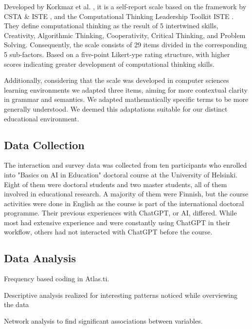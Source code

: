 \documentclass[sn-mathphys, Numbered]{sn-jnl}%
\theoremstyle{thmstyleone}%
\theoremstyle{thmstyletwo}%
\theoremstyle{thmstylethree}%
\begin{document}
Developed by Korkmaz et al. \parencite*{korkmaz_validity_2017-1}, it is a self-report scale based on the framework by CSTA \& ISTE \parencite*{csta_iste_operational_2015}, and the Computational Thinking Leadership Toolkit ISTE \parencite*{iste_computational_2011}. They define computational thinking as the result of 5 intertwined skills, Creativity, Algorithmic Thinking, Cooperativity, Critical Thinking, and Problem Solving. Consequently, the scale consists of 29 items divided in the corresponding 5 sub-factors. Based on a five-point Likert-ype rating structure, with higher scores indicating greater development of computational thinking skills. 

Additionally, considering that the scale was developed in computer sciences learning environments we adapted three items, aiming for more contextual clarity in grammar and semantics. We adapted mathematically specific terms to be more generally understood. We deemed this adaptations suitable for our distinct educational environment.


\subsection{Data Collection}

The interaction and survey data was collected from ten participants who enrolled into "Basics on AI in Education" doctoral course at the University of Helsinki. Eight of them were doctoral students and two master students, all of them involved in educational research. A majority of them were Finnish, but the course activities were done in English as the course is part of the international doctoral programme. Their previous experiences with ChatGPT, or AI, differed. While most had extensive experience and were constantly using ChatGPT in their workflow, others had not interacted with ChatGPT before the course.



\subsection{Data Analysis}

Frequency based coding in Atlas.ti. 

Descriptive analysis realized for interesting patterns noticed while overviewing the data

Network analysis to find significant associations between variables.




\end{document}
